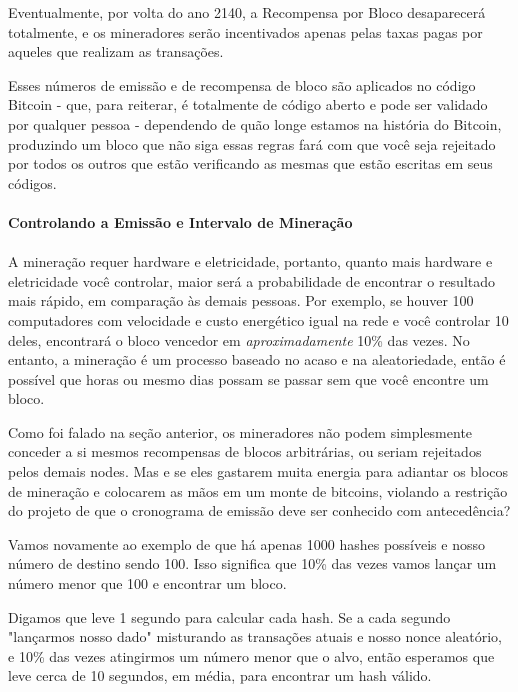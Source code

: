 Eventualmente, por volta do ano 2140, a Recompensa por Bloco desaparecerá totalmente, e os mineradores serão incentivados apenas pelas taxas pagas por aqueles que realizam as transações.

Esses números de emissão e de recompensa de bloco são aplicados no código Bitcoin - que, para reiterar, é totalmente de código aberto e pode ser validado por qualquer pessoa - dependendo de quão longe estamos na história do Bitcoin, produzindo um bloco que não siga essas regras fará com que você seja rejeitado por todos os outros que estão verificando as mesmas que estão escritas em seus códigos.

\paragraph{Controlando a Emissão e Intervalo de Mineração}
\paragraph{}

A mineração requer hardware e eletricidade, portanto, quanto mais hardware e eletricidade você controlar, maior será a probabilidade de encontrar o resultado mais rápido, em comparação às demais pessoas. Por exemplo, se houver 100 computadores com velocidade e custo energético igual na rede e você controlar 10 deles, encontrará o bloco vencedor em \textit{aproximadamente} 10\% das vezes. No entanto, a mineração é um processo baseado no acaso e na aleatoriedade, então é possível que horas ou mesmo dias possam se passar sem que você encontre um bloco.

Como foi falado na seção anterior, os mineradores não podem simplesmente conceder a si mesmos recompensas de blocos arbitrárias, ou seriam rejeitados pelos demais nodes. Mas e se eles gastarem muita energia para adiantar os blocos de mineração e colocarem as mãos em um monte de bitcoins, violando a restrição do projeto de que o cronograma de emissão deve ser conhecido com antecedência?

Vamos novamente ao exemplo de que há apenas 1000 hashes possíveis e nosso número de destino sendo 100. Isso significa que 10\% das vezes vamos lançar um número menor que 100 e encontrar um bloco.

Digamos que leve 1 segundo para calcular cada hash. Se a cada segundo "lançarmos nosso dado" misturando as transações atuais e nosso nonce aleatório, e 10\% das vezes atingirmos um número menor que o alvo, então esperamos que leve cerca de 10 segundos, em média, para encontrar um hash válido.

